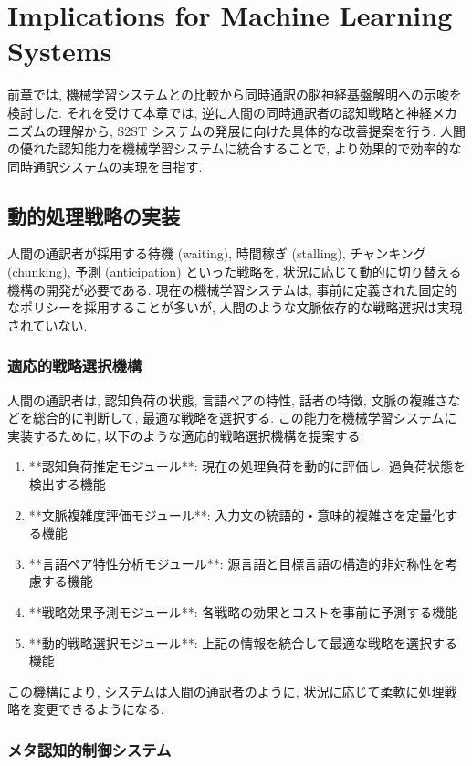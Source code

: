 \section{Implications for Machine Learning Systems}

前章では, 機械学習システムとの比較から同時通訳の脳神経基盤解明への示唆を検討した.
それを受けて本章では, 逆に人間の同時通訳者の認知戦略と神経メカニズムの理解から, S2ST システムの発展に向けた具体的な改善提案を行う.
人間の優れた認知能力を機械学習システムに統合することで, より効果的で効率的な同時通訳システムの実現を目指す.

\subsection{動的処理戦略の実装}

人間の通訳者が採用する待機 (waiting), 時間稼ぎ (stalling), チャンキング (chunking), 予測 (anticipation) といった戦略を, 状況に応じて動的に切り替える機構の開発が必要である.
現在の機械学習システムは, 事前に定義された固定的なポリシーを採用することが多いが, 人間のような文脈依存的な戦略選択は実現されていない.

\subsubsection{適応的戦略選択機構}

人間の通訳者は, 認知負荷の状態, 言語ペアの特性, 話者の特徴, 文脈の複雑さなどを総合的に判断して, 最適な戦略を選択する.
この能力を機械学習システムに実装するために, 以下のような適応的戦略選択機構を提案する:

\begin{enumerate}
\item **認知負荷推定モジュール**: 現在の処理負荷を動的に評価し, 過負荷状態を検出する機能
\item **文脈複雑度評価モジュール**: 入力文の統語的・意味的複雑さを定量化する機能  
\item **言語ペア特性分析モジュール**: 源言語と目標言語の構造的非対称性を考慮する機能
\item **戦略効果予測モジュール**: 各戦略の効果とコストを事前に予測する機能
\item **動的戦略選択モジュール**: 上記の情報を統合して最適な戦略を選択する機能
\end{enumerate}

この機構により, システムは人間の通訳者のように, 状況に応じて柔軟に処理戦略を変更できるようになる.

\subsubsection{メタ認知的制御システム}

